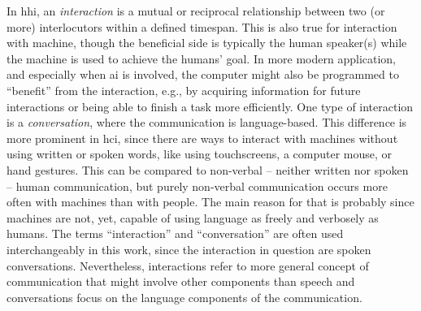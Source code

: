 In \ac{hhi}, an \emph{interaction} is a mutual or reciprocal relationship between two (or more) interlocutors within a defined timespan.
This is also true for interaction with machine, though the beneficial side is typically the human speaker(s) while the machine is used to achieve the humans' goal.
In more modern application, and especially when \ac{ai} is involved, the computer might also be programmed to \enquote{benefit} from the interaction, e.g., by acquiring information for future interactions or being able to finish a task more efficiently.
One type of interaction is a \emph{conversation}, where the communication is language-based.
This difference is more prominent in \ac{hci}, since there are ways to interact with machines without using written or spoken words, like using touchscreens, a computer mouse, or hand gestures. This can be compared to non-verbal -- neither written nor spoken -- human communication, but purely non-verbal communication occurs more often with machines than with people.
The main reason for that is probably since machines are not, yet, capable of using language as freely and verbosely as humans.
The terms \enquote{interaction} and \enquote{conversation} are often used interchangeably in this work, since the interaction in question are spoken conversations.
Nevertheless, interactions refer to more general concept of communication that might involve other components than speech and conversations focus on the language components of the communication.

